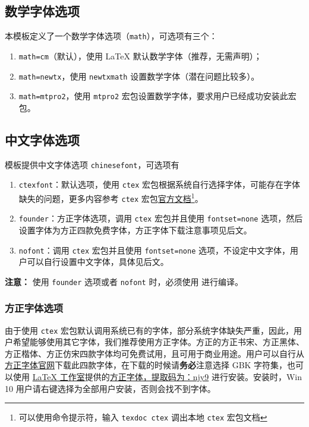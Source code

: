 \documentclass[lang=cn,11pt,a4paper,cite=authoryear]{elegantpaper}
\begin{document}
\subsection{数学字体选项}

本模板定义了一个数学字体选项（\lstinline{math}），可选项有三个：
\begin{enumerate}
  \item \lstinline{math=cm}（默认），使用 \LaTeX{} 默认数学字体（推荐，无需声明）；
  \item \lstinline{math=newtx}，使用 \lstinline{newtxmath} 设置数学字体（潜在问题比较多）。
  \item \lstinline{math=mtpro2}，使用 \lstinline{mtpro2} 宏包设置数学字体，要求用户已经成功安装此宏包。
\end{enumerate}

\subsection{中文字体选项}
模板提供中文字体选项 \lstinline{chinesefont}，可选项有
\begin{enumerate}
\item \lstinline{ctexfont}：默认选项，使用 \lstinline{ctex} 宏包根据系统自行选择字体，可能存在字体缺失的问题，更多内容参考 \lstinline{ctex} 宏包\href{https://ctan.org/pkg/ctex}{官方文档}\footnote{可以使用命令提示符，输入 \lstinline{texdoc ctex} 调出本地 \lstinline{ctex} 宏包文档}。
\item \lstinline{founder}：方正字体选项，调用 \lstinline{ctex} 宏包并且使用 \lstinline{fontset=none} 选项，然后设置字体为方正四款免费字体，方正字体下载注意事项见后文。
\item \lstinline{nofont}：调用 \lstinline{ctex} 宏包并且使用 \lstinline{fontset=none} 选项，不设定中文字体，用户可以自行设置中文字体，具体见后文。
\end{enumerate}

\noindent \textbf{注意：} 使用 \lstinline{founder} 选项或者 \lstinline{nofont} 时，必须使用  进行编译。

\subsubsection{方正字体选项}
由于使用 \lstinline{ctex} 宏包默认调用系统已有的字体，部分系统字体缺失严重，因此，用户希望能够使用其它字体，我们推荐使用方正字体。方正的{\songti 方正书宋}、{\heiti 方正黑体}、{\kaishu 方正楷体}、{\fangsong 方正仿宋}四款字体均可免费试用，且可用于商业用途。用户可以自行从\href{http://www.foundertype.com/}{方正字体官网}下载此四款字体，在下载的时候请\textbf{务必}注意选择 GBK 字符集，也可以使用 \href{https://www.latexstudio.net/}{\LaTeX{} 工作室}提供的\href{https://pan.baidu.com/s/1BgbQM7LoinY7m8yeP25Y7Q}{方正字体，提取码为：njy9} 进行安装。安装时，{\kaishu Win 10 用户请右键选择为全部用户安装，否则会找不到字体。}
\end{document}
